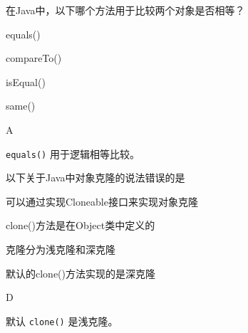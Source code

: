 \begin{question}
	在Java中，以下哪个方法用于比较两个对象是否相等？
	\begin{options}
		\item equals()
		\item compareTo()
		\item isEqual()
		\item same()
	\end{options}
	\begin{answer}
		A
	\end{answer}
	\begin{explanation}
		\texttt{equals()} 用于逻辑相等比较。
	\end{explanation}
\end{question}

\begin{question}
	以下关于Java中对象克隆的说法错误的是
	\begin{options}
		\item 可以通过实现Cloneable接口来实现对象克隆
		\item clone()方法是在Object类中定义的
		\item 克隆分为浅克隆和深克隆
		\item 默认的clone()方法实现的是深克隆
	\end{options}
	\begin{answer}
		D
	\end{answer}
	\begin{explanation}
		默认 \texttt{clone()} 是浅克隆。
	\end{explanation}
\end{question}
